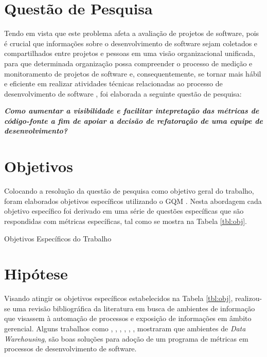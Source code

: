 
\section{Questão de Pesquisa}

Tendo em vista que este problema afeta a avaliação de projetos de software, pois é crucial que informações sobre o desenvolvimento de software sejam coletados e compartilhados entre projetos e pessoas em uma visão organizacional unificada, para que determinada organização possa compreender o processo de medição e monitoramento de projetos de software e, consequentemente, se tornar mais hábil e eficiente em realizar atividades técnicas relacionadas ao processo de desenvolvimento de software \cite{Chulani2003}, foi elaborada a seguinte questão de pesquisa:

\textit{\textbf{Como aumentar a
visibilidade e facilitar intepretação das 
métricas de código-fonte
a fim de apoiar a decisão de refatoração
de uma equipe de desenvolvimento?}}


\section{Objetivos}

Colocando a resolução da questão de pesquisa como objetivo geral do trabalho, foram elaborados objetivos específicos utilizando o GQM \cite{Basili96b}. Nesta abordagem cada objetivo específico foi derivado em uma série de questões específicas que são respondidas com métricas específicas, tal como se mostra na Tabela \ref{tbl:obj}. 

\begin{table}
\centering

\caption{Objetivos Específicos do Trabalho}
\label{tbl:obj} 
\end{table}
\FloatBarrier

\section{Hipótese}

Visando atingir os objetivos específicos estabelecidos na Tabela \ref{tbl:obj}, realizou-se uma revisão bibliográfica da literatura em busca de ambientes de informação que visassem à automação de processos e exposição de informações em âmbito gerencial.
Alguns trabalhos como , , , , , , mostraram que ambientes de \textit{Data Warehousing}, são boas soluções para adoção de um programa de métricas em processos de desenvolvimento de software.

